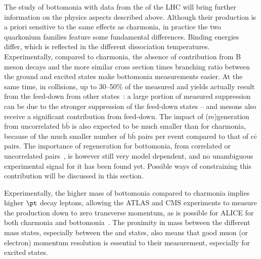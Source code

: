 \documentclass[../report.tex]{subfiles}
\begin{document}
The study of bottomonia with \PbPb data from the \RunsThreeFour of the LHC will bring further information on the physics aspects described above.
Although their production is a priori sensitive to the same effects as charmonia, in practice the two quarkonium families feature some fundamental differences.
Binding energies differ, which is reflected in the different dissociation temperatures.
Experimentally, compared to charmonia, the absence of contribution from B meson decays and the more similar cross section times branching ratio between the ground and excited states make bottomonia measurements easier. 
At the same time, in \pp collisions, up to 30--50\% of the measured 
 and  yields actually result from the feed-down from other states~\cite{Andronic:2015wma,Aaij:2014caa}:
a large portion of measured  suppression can be due to the stronger suppression of the feed-down states --  and  mesons also receive a significant contribution from feed-down.
The impact of (re)generation from uncorrelated $\text{b}\bar{\text{b}}$ is also expected to be much smaller than for charmonia, because of the much smaller number of $\text{b}\bar{\text{b}}$
pairs per \PbPb event compared to that of $\text{c}\bar{\text{c}}$ pairs. The importance of regeneration for bottomonia, from correlated or uncorrelated pairs~\cite{Petreczky:2016etz}, is however still very model dependent, and no unambiguous experimental signal
for it has been found yet. Possible ways of constraining this contribution will be discussed in this section.

Experimentally, the higher mass of bottomonia compared to charmonia implies higher $\pt$ decay leptons, allowing the ATLAS and CMS experiments to measure the production down to zero transverse momentum,
as is possible for ALICE for both charmonia and bottomonia~\cite{Abelev:2014nua,Acharya:2018mni}. The proximity in mass between the different mass states, especially between the  and  states, also 
means that good muon (or electron) momentum resolution is essential to their measurement, especially for excited states. 
\end{document}
